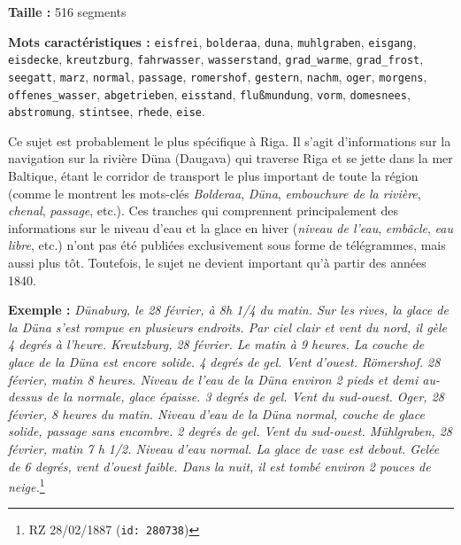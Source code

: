 \documentclass[a4paper,twoside,12pt]{article}
\begin{document}
\begin{flushleft}
\textbf{Taille :} 516 segments

\textbf{Mots caractéristiques :} \texttt{eisfrei}, \texttt{bolderaa}, \texttt{duna}, \texttt{muhlgraben}, \texttt{eisgang}, \texttt{eisdecke}, \texttt{kreutzburg}, \texttt{fahrwasser}, \texttt{wasserstand}, \texttt{grad\_warme}, \texttt{grad\_frost}, \texttt{seegatt}, \texttt{marz}, \texttt{normal}, \texttt{passage}, \texttt{romershof}, \texttt{gestern}, \texttt{nachm}, \texttt{oger}, \texttt{morgens}, \texttt{offenes\_wasser}, \texttt{abgetrieben}, \texttt{eisstand}, \texttt{flußmundung}, \texttt{vorm}, \texttt{domesnees}, \texttt{abstromung}, \texttt{stintsee}, \texttt{rhede}, \texttt{eise}.
\end{flushleft}

\noindent Ce sujet est probablement le plus spécifique à Riga. Il s'agit d'informations sur la navigation sur la rivière Düna (Daugava) qui traverse Riga et se jette dans la mer Baltique, étant le corridor de transport le plus important de toute la région (comme le montrent les mots-clés \textit{Bolderaa}, \textit{Düna}, \textit{embouchure de la rivière}, \textit{chenal}, \textit{passage}, etc.). Ces tranches qui comprennent principalement des informations sur le niveau d'eau et la glace en hiver (\textit{niveau de l'eau}, \textit{embâcle}, \textit{eau libre}, etc.) n'ont pas été publiées exclusivement sous forme de télégrammes, mais aussi plus tôt. Toutefois, le sujet ne devient important qu'à partir des années 1840.

\medskip

\noindent \textbf{Exemple :} \textit{Dünaburg, le 28 février, à 8h 1/4 du matin. Sur les rives, la glace de la Düna s'est rompue en plusieurs endroits. Par ciel clair et vent du nord, il gèle 4 degrés à l'heure. Kreutzburg, 28 février. Le matin à 9 heures. La couche de glace de la Düna est encore solide. 4 degrés de gel. Vent d'ouest.
Römershof. 28 février, matin 8 heures. Niveau de l'eau de la Düna environ 2 pieds et demi au-dessus de la normale, glace épaisse. 3 degrés de gel. Vent du sud-ouest. Oger, 28 février, 8 heures du matin. Niveau d'eau de la Düna normal, couche de glace solide, passage sans encombre. 2 degrés de gel. Vent du sud-ouest. Mühlgraben, 28 février, matin 7 h 1/2. Niveau d'eau normal. La glace de vase est debout. Gelée de 6 degrés, vent d'ouest faible. Dans la nuit, il est tombé environ 2 pouces de neige.}\footnote{RZ 28/02/1887 (\texttt{id: 280738})}

\clearpage
\end{document}
